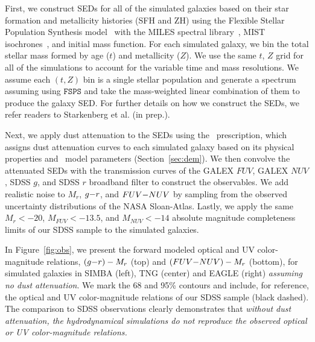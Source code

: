 First, we construct SEDs for all of the simulated galaxies based on their star
formation and metallicity histories (SFH and ZH) using the Flexible Stellar Population Synthesis
model~\citep[$\mathtt{FSPS}$;][]{conroy2009, conroy2010} with the MILES
spectral library~\citep{sanchez_blazquez2006}, MIST
isochrones~\citep{paxton2011, paxton2013, paxton2015, choi2016, dotter2016},
and \cite{chabrier2003} initial mass function.
For each simulated galaxy, we bin the total stellar mass formed by age ($t$) and metallicity
($Z$). We use the same $t$, $Z$ grid for all of the simulations
to account for the variable time and mass resolutions. 
We assume each $(t, Z)$ bin is a single stellar population and generate a
spectrum assuming using $\mathtt{FSPS}$ and take the mass-weighted linear
combination of them to produce the galaxy SED. 
For further details on how we construct the SEDs, we refer readers to
Starkenberg et al. (in prep.).

Next, we apply dust attenuation to the SEDs using the \eda~prescription, which 
assigns dust attenuation curves to each simulated galaxy based on its physical
properties and \eda~model parameters (Section~\ref{sec:dem}). 
We then convolve the attenuated SEDs with the transmission curves of the GALEX
$FUV$, GALEX $NUV$, SDSS $g$, and SDSS $r$ broadband filter to construct the
observables. 
We add realistic noise to $M_r$, $g{-}r$, and $FUV{-}NUV$ by sampling from the
observed uncertainty distributions of the NASA Sloan-Atlas.
Lastly, we apply the same $M_r < -20$, $M_{FUV} < -13.5$, and $M_{NUV} < -14$
absolute magnitude completeness limits of our SDSS sample to the simulated 
galaxies. 

In Figure~\ref{fig:obs}, we present the forward modeled optical and UV
color-magnitude relations, $(g{-}r)-M_r$ (top) and $(FUV{-}NUV)-M_r$ (bottom),
for simulated galaxies in SIMBA (left), TNG (center) and EAGLE (right)
\emph{assuming no dust attenuation}. We mark the 68 and 95\% contours and
include, for reference, the optical and UV color-magnitude relations of our
SDSS sample (black dashed). 
The comparison to SDSS observations clearly demonstrates
that {\em without dust attenuation, the hydrodynamical simulations do not
reproduce the observed optical or UV color-magnitude relations.}

